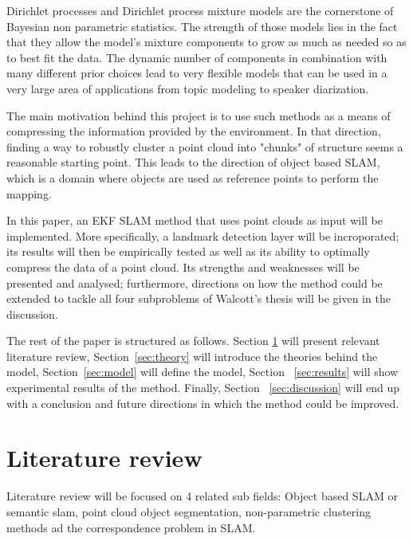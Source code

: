 \documentclass[twoside,hidelinks]{article}
\begin{document}
Dirichlet processes and Dirichlet process mixture models \cite{nonParam} are the cornerstone of Bayesian non parametric statistics. The strength of those models lies in the fact that they allow the model's mixture components to grow as much as needed so as to best fit the data. The dynamic number of components in combination with many different prior choices lead to very flexible models that can be used in a very large area of applications from topic modeling\cite{LDA} to speaker diarization\cite{speakerDiar}. 

The main motivation behind this project is to use such methods as a means of compressing the information provided by the environment. In that direction, finding a way to robustly cluster a point cloud into "chunks" of structure seems a reasonable starting point. This leads to the direction of object based SLAM, which is a domain where objects are used as reference points to perform the mapping.

In this paper, an EKF SLAM method that uses point clouds as input will be implemented. More specifically, a landmark detection layer will be incroporated; its results will then be empirically tested as well as its ability to optimally compress the data of a point cloud. Its strengths and weaknesses will be presented and analysed; furthermore, directions on how the method could be extended to tackle all four subproblems of Walcott's thesis will be given in the discussion.

The rest of the paper is structured as follows. Section \ref{sec:literature} will present relevant literature review, Section~\ref{sec:theory} will introduce the theories behind the model, Section~\ref{sec:model} will define the model, Section ~\ref{sec:results} will show experimental results of the method. Finally, Section ~\ref{sec:discussion} will end up with a conclusion and future directions in which the method could be improved.

\section{Literature review}
\label{sec:literature}

Literature review will be focused on 4 related sub fields: Object based SLAM or semantic slam, point cloud object segmentation, non-parametric clustering methods ad the correspondence problem in SLAM.
\end{document}
